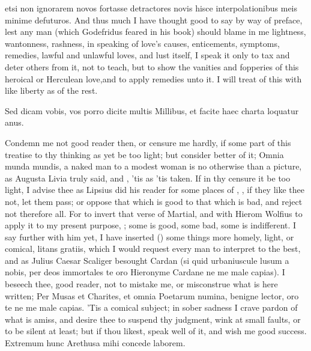 {etsi non ignorarem novos fortasse detractores novis hisce
interpolationibus meis minime defuturos. 
And thus much I have thought good to say by way of preface, lest any
man (which Godefridus feared in his book) should blame in me
lightness, wantonness, rashness, in speaking of love's causes,
enticements, symptoms, remedies, lawful and unlawful loves, and lust
itself, I speak it only to tax and deter others from it, not to
teach, but to show the vanities and fopperies of this heroical or
Herculean love,and to apply remedies unto it. I will treat of
this with like liberty as of the rest.

Sed dicam vobis, vos porro dicite multis
Millibus, et facite haec charta loquatur anus.

Condemn me not good reader then, or censure me hardly, if some part of
this treatise to thy thinking as yet be too light; but consider better
of it; Omnia munda mundis, a naked man to a modest woman is no
otherwise than a picture, as Augusta Livia truly said, and , 'tis as 'tis taken. If in thy censure it be too
light, I advise thee as Lipsius did his reader for some places of
\Plautus{}, , if they like thee
not, let them pass; or oppose that which is good to that which is bad,
and reject not therefore all. For to invert that verse of Martial, and
with Hierom Wolfius to apply it to my present purpose, ; some is good, some bad, some is
indifferent. I say further with him yet, I have inserted
() some
things more homely, light, or comical, litans gratiis, \etc{} which I
would request every man to interpret to the best, and as Julius Caesar
Scaliger besought Cardan (si quid urbaniuscule lusum a nobis, per deos
immortales te oro Hieronyme Cardane ne me male capias). I beseech thee,
good reader, not to mistake me, or misconstrue what is here written;
Per Musas et Charites, et omnia Poetarum numina, benigne lector, oro te
ne me male capias. 'Tis a comical subject; in sober sadness I crave
pardon of what is amiss, and desire thee to suspend thy judgment, wink
at small faults, or to be silent at least; but if thou likest, speak
well of it, and wish me good success. Extremum hunc Arethusa mihi
concede laborem.

}
